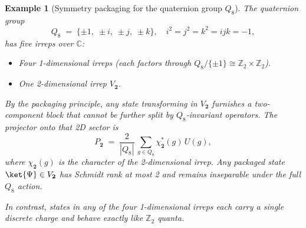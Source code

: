 \documentclass[12pt,a4paper]{article}
\newtheorem{example}{Example}
\begin{document}
\begin{example}[Symmetry packaging for the quaternion group $Q_8$]
	The quaternion group
	\[
	Q_8 \;=\;\{\pm1,\;\pm i,\;\pm j,\;\pm k\},
	\quad
	i^2=j^2=k^2=ijk=-1,
	\]
	has five irreps over $\mathbb C$:
	\begin{itemize}
		\item Four 1-dimensional irreps (each factors through $Q_8/\{\pm1\}\cong \mathbb Z_2\times\mathbb Z_2$).
		
		\item One 2-dimensional irrep $V_{\mathbf2}$.
	\end{itemize}
	
	By the packaging principle, any state transforming in $V_{\mathbf2}$ furnishes a two-component block that cannot be further split by $Q_8$-invariant operators.
	The projector onto that 2D sector is
	\[
	P_{\mathbf2}
	\;=\;
	\frac{2}{|Q_8|}\,
	\sum_{g\in Q_8}\chi_{\mathbf2}^*(g)\,U(g),
	\]
	where $\chi_{\mathbf2}(g)$ is the character of the 2-dimensional irrep.
	Any packaged state $\ket{\Psi}\in V_{\mathbf2}$ has Schmidt rank at most 2 and remains inseparable under the full $Q_8$ action.
	
	In contrast, states in any of the four 1-dimensional irreps each carry a single discrete charge and behave exactly like $\mathbb Z_2$ quanta.
\end{example}
\end{document}
